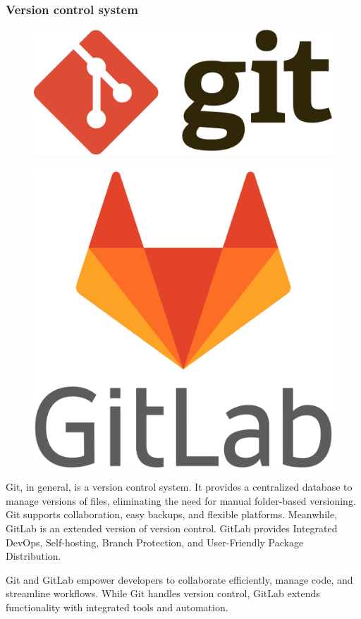     \subsubsection{Version control system}
    \begin{figure}[H]
        \centering
        \begin{minipage}{.5\textwidth}
          \centering
          \includegraphics[width=.35\linewidth]{graphics/git-logo.png}
          \label{fig:git}
        \end{minipage}%
        \begin{minipage}{.5\textwidth}
          \centering
          \includegraphics[width=.2\linewidth]{graphics/gitlab-logo.png}
          \label{fig:gitlab}
        \end{minipage}
    \end{figure}
    Git, in general, is a version control system. It provides a centralized database to manage versions of files, eliminating the need for manual folder-based versioning. Git supports collaboration, easy backups, and flexible platforms. Meanwhile, GitLab is an extended version of version control. GitLab provides Integrated DevOps, Self-hosting, Branch Protection, and User-Friendly Package Distribution.
    
    Git and GitLab empower developers to collaborate efficiently, manage code, and streamline workflows. While Git handles version control, GitLab extends functionality with integrated tools and automation. 
    